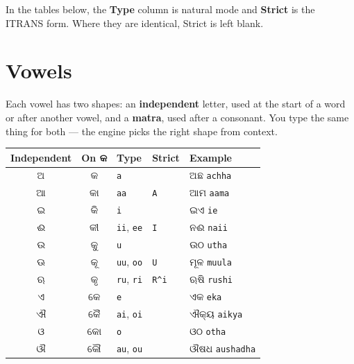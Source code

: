 \documentclass[11pt, a4paper]{article}
\newcommand{\od}[1]{{\odiafont #1}}          %
\newcommand{\odb}[1]{{\odiafont\large #1}}   %
\begin{document}
In the tables below, the \textbf{Type} column is natural mode and \textbf{Strict} is the
ITRANS form. Where they are identical, Strict is left blank.

\section{Vowels}

Each vowel has two shapes: an \textbf{independent} letter, used at the start of a word or
after another vowel, and a \textbf{matra}, used after a consonant. You type the same
thing for both --- the engine picks the right shape from context.

\begin{center}
\begin{tabular}{c c l l l}
\toprule
Independent & On \od{କ} & Type & Strict & Example \\
\midrule
\odb{ଅ}  & \odb{କ}   & \texttt{a}   &                & \od{ଅଛ} \texttt{achha} \\
\odb{ଆ}  & \odb{କା}  & \texttt{aa}  & \texttt{A}     & \od{ଆମ} \texttt{aama} \\
\odb{ଇ}  & \odb{କି}  & \texttt{i}   &                & \od{ଇଏ} \texttt{ie} \\
\odb{ଈ}  & \odb{କୀ}  & \texttt{ii}, \texttt{ee} & \texttt{I} & \od{ନଈ} \texttt{naii} \\
\odb{ଉ}  & \odb{କୁ}  & \texttt{u}   &                & \od{ଉଠ} \texttt{utha} \\
\odb{ଊ}  & \odb{କୂ}  & \texttt{uu}, \texttt{oo} & \texttt{U} & \od{ମୂଳ} \texttt{muula} \\
\odb{ଋ}  & \odb{କୃ}  & \texttt{ru}, \texttt{ri} & \texttt{R\^{}i} & \od{ଋଷି} \texttt{rushi} \\
\odb{ଏ}  & \odb{କେ}  & \texttt{e}   &                & \od{ଏକ} \texttt{eka} \\
\odb{ଐ}  & \odb{କୈ}  & \texttt{ai}, \texttt{oi} &     & \od{ଐକ୍ୟ} \texttt{aikya} \\
\odb{ଓ}  & \odb{କୋ}  & \texttt{o}   &                & \od{ଓଠ} \texttt{otha} \\
\odb{ଔ}  & \odb{କୌ}  & \texttt{au}, \texttt{ou} &     & \od{ଔଷଧ} \texttt{aushadha} \\
\bottomrule
\end{tabular}
\end{center}
\end{document}
